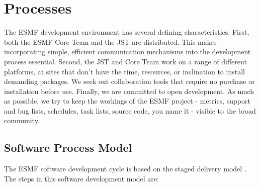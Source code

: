 
\section{Processes}
\label{sec:life_cycle}

The ESMF development environment has several defining characteristics.
First, both the ESMF Core Team and the JST are distributed.  This makes
incorporating simple, efficient communication mechanisms into the
development process essential.  Second, the JST and Core Team work on
a range of different platforms, at sites that don't have the time, resources,
or inclination to install demanding packages.  We seek out collaboration
tools that require no purchase or installation before use.
Finally, we are committed to open development.  As much as possible, we
try to keep the workings of the ESMF project - metrics,
support and bug lists, schedules, task lists, source code, you name it -
visible to the broad community.

\subsection{Software Process Model}

The ESMF software development cycle is based on the staged 
delivery model \cite{mcconnell96}.  The steps in this software development
model are:

